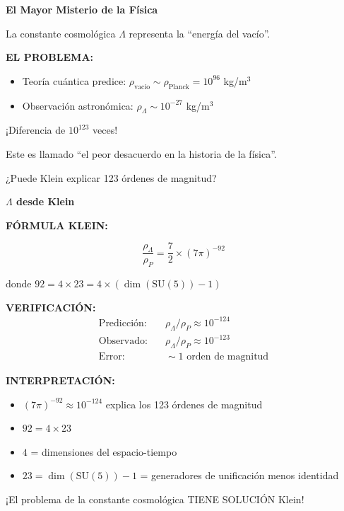 \begin{nivelconceptual}
\textbf{El Mayor Misterio de la Física}

La constante cosmológica $\Lambda$ representa la ``energía del vacío''.

\textbf{EL PROBLEMA:}
\begin{itemize}
    \item Teoría cuántica predice: $\rho_{\text{vacío}} \sim \rho_{\text{Planck}} = 10^{96}$ kg/m$^3$
    \item Observación astronómica: $\rho_\Lambda \sim 10^{-27}$ kg/m$^3$
\end{itemize}

¡Diferencia de $10^{123}$ veces!

Este es llamado ``el peor desacuerdo en la historia de la física''.

¿Puede Klein explicar 123 órdenes de magnitud?
\end{nivelconceptual}

\begin{nivelmatematico}
\textbf{$\Lambda$ desde Klein}

\textbf{FÓRMULA KLEIN:}

\begin{equation}
\boxed{\frac{\rho_\Lambda}{\rho_P} = \frac{7}{2} \times (7\pi)^{-92}}
\end{equation}

donde $92 = 4 \times 23 = 4 \times (\dim(\text{SU}(5)) - 1)$

\textbf{VERIFICACIÓN:}
\begin{align}
\text{Predicción:} & \quad \rho_\Lambda/\rho_P \approx 10^{-124}\\
\text{Observado:} & \quad \rho_\Lambda/\rho_P \approx 10^{-123}\\
\text{Error:} & \quad \sim 1 \text{ orden de magnitud}
\end{align}

\textbf{INTERPRETACIÓN:}
\begin{itemize}
    \item $(7\pi)^{-92} \approx 10^{-124}$ explica los 123 órdenes de magnitud
    \item $92 = 4 \times 23$
    \item $4$ = dimensiones del espacio-tiempo
    \item $23 = \dim(\text{SU}(5)) - 1$ = generadores de unificación menos identidad
\end{itemize}

¡El problema de la constante cosmológica TIENE SOLUCIÓN Klein!
\end{nivelmatematico}


